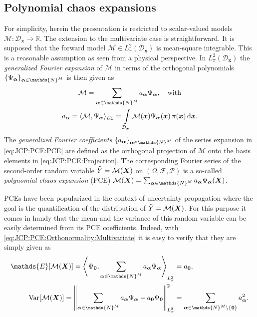 \subsection{Polynomial chaos expansions}
For simplicity, herein the presentation is restricted to scalar-valued models \(\mathcal{M} \colon \mathcal{D}_{\bm{x}} \rightarrow \mathds{R}\).
The extension to the multivariate case is straightforward.
It is supposed that the forward model \(\mathcal{M} \in L_{\pi}^2(\mathcal{D}_{\bm{x}})\) is mean-square integrable.
This is a reasonable assumption as seen from a physical perspective.
In \(L_{\pi}^2(\mathcal{D}_{\bm{x}})\) the \emph{generalized Fourier expansion} of \(\mathcal{M}\)
in terms of the orthogonal polynomials \(\{\basis_{\bm{\alpha}}\}_{\bm{\alpha} \in \mathds{N}^\dimParam}\) is then given as
\begin{gather}
  \mathcal{M} = \sum\limits_{\bm{\alpha} \in \mathds{N}^\dimParam} \coeffM_{\bm{\alpha}} \basis_{\bm{\alpha}}, \quad \text{with} \label{eq:JCP:PCE:PCE} \\
  \coeffM_{\bm{\alpha}}
  = \langle \mathcal{M}, \basis_{\bm{\alpha}} \rangle_{L_{\pi}^2}
  = \int\limits_{\mathcal{D}_{\bm{x}}} \mathcal{M}(\bm{x}) \basis_{\bm{\alpha}}(\bm{x}) \, \pi(\bm{x}) \, \mathrm{d} \bm{x}. \label{eq:JCP:PCE:Projection}
\end{gather}
The \emph{generalized Fourier coefficients} \(\{\coeffM_{\bm{\alpha}}\}_{\bm{\alpha} \in \mathds{N}^\dimParam}\) of the series expansion in \cref{eq:JCP:PCE:PCE}
are defined as the orthogonal projection of \(\mathcal{M}\) onto the basis elements in \cref{eq:JCP:PCE:Projection}.
The corresponding Fourier series of the second-order random variable \(\tilde{Y} = \mathcal{M}(\bm{X})\) on \((\Omega,\mathcal{F},\mathcal{P})\) is a so-called
\emph{polynomial chaos expansion} (PCE) \(\mathcal{M}(\bm{X}) = \sum_{\bm{\alpha} \in \mathds{N}^\dimParam} \coeffM_{\bm{\alpha}} \basis_{\bm{\alpha}}(\bm{X})\).
\par %
PCEs have been popularized in the context of uncertainty propagation where the goal is the quantification of the distribution of \(\tilde{Y} = \mathcal{M}(\bm{X})\).
For this purpose it comes in handy that the mean and the variance of this random variable can be easily determined from its PCE coefficients.
Indeed, with \cref{eq:JCP:PCE:Orthonormality:Multivariate} it is easy to verify that they are simply given as
\begin{align}
  \mathds{E}[\mathcal{M}(\bm{X})] = \left\langle \basis_{\bm{0}}, \sum\limits_{\bm{\alpha} \in \mathds{N}^\dimParam} \coeffM_{\bm{\alpha}} \basis_{\bm{\alpha}} \right\rangle_{L_{\pi}^2}
  &= \coeffM_{\bm{0}}, \label{eq:JCP:PCE:Mean} \\
  \mathrm{Var}[\mathcal{M}(\bm{X})]
  = \left\lVert \sum\limits_{\bm{\alpha} \in \mathds{N}^\dimParam} \coeffM_{\bm{\alpha}} \basis_{\bm{\alpha}} - \coeffM_{\bm{0}} \basis_{\bm{0}} \right\rVert_{L_{\pi}^2}^2
  &= \sum\limits_{\bm{\alpha} \in \mathds{N}^\dimParam  \setminus \{\bm{0}\}} \coeffM_{\bm{\alpha}}^2. \label{eq:JCP:PCE:Variance}
\end{align}
